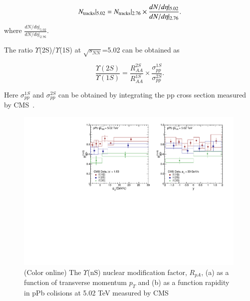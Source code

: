 \begin{equation}
N_{\rm tracks}|_{5.02} =  N_{\rm tracks}|_{2.76} \times \frac{dN/d\eta |_{5.02}} {dN/d\eta|_{2.76}}.
\end{equation}
where $\frac{dN/d\eta |_{5.02}} {dN/d\eta|_{2.76}}$.

The ratio $\Upsilon$(2S)/$\Upsilon$(1S) at $\sqrt{s_{NN}}$=5.02 can be obtained as 

\begin{equation}
\frac{\Upsilon(2S)}{\Upsilon(1S)} = \frac{R_{AA}^{2S}}{R_{AA}^{1S}} \times \frac{\sigma_{pp}^{1S}}{\sigma_{pp}^{2S}}.
\end{equation}

Here $\sigma_{pp}^{1S}$ and $\sigma_{pp}^{2S}$ can be obtained by integrating the pp cross section
measured by CMS~\cite{CMS:2018zza}.




\begin{figure}
  \includegraphics[width=0.99\textwidth]{Figures/ExpOverview/Fig_LHC_YnSRPPbPtRap.pdf}
     \caption{(Color online) The $\Upsilon$(nS) nuclear modification factor, $R_{pA}$,
      (a) as a function of transverse momentum $p_{T}$
    and (b) as a function rapidity in pPb colisions at 5.02 TeV measured by CMS~\cite{CMS:2022wfi}
  }
  \label{fig:LHCpPb5}
\end{figure}






